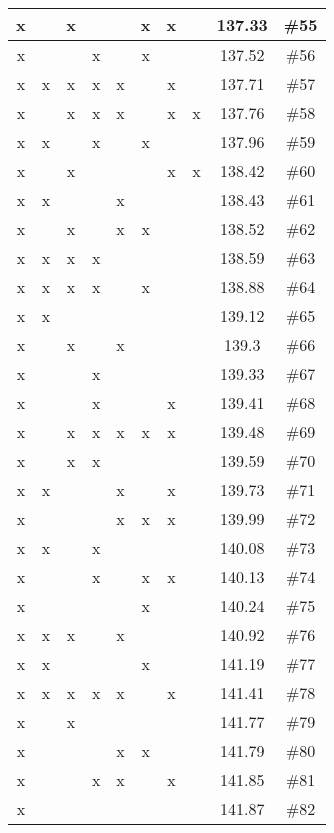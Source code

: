 \begin{center}
\begin{longtable}{|c|c|c|c|c|c|c|c|c|c|}
 x &  &  x &  &  &  x &  x &  & 137.33 & \#55 \\ \hline
 x &  &  &  x &  &  x &  &  & 137.52 & \#56 \\ \hline
 x &  x &  x &  x &  x &  &  x &  & 137.71 & \#57 \\ \hline
 x &  &  x &  x &  x &  &  x &  x & 137.76 & \#58 \\ \hline
 x &  x &  &  x &  &  x &  &  & 137.96 & \#59 \\ \hline
 x &  &  x &  &  &  &  x &  x & 138.42 & \#60 \\ \hline
 x &  x &  &  &  x &  &  &  & 138.43 & \#61 \\ \hline
 x &  &  x &  &  x &  x &  &  & 138.52 & \#62 \\ \hline
 x &  x &  x &  x &  &  &  &  & 138.59 & \#63 \\ \hline
 x &  x &  x &  x &  &  x &  &  & 138.88 & \#64 \\ \hline
 x &  x &  &  &  &  &  &  & 139.12 & \#65 \\ \hline
 x &  &  x &  &  x &  &  &  & 139.3 & \#66 \\ \hline
 x &  &  &  x &  &  &  &  & 139.33 & \#67 \\ \hline
 x &  &  &  x &  &  &  x &  & 139.41 & \#68 \\ \hline
 x &  &  x &  x &  x &  x &  x &  & 139.48 & \#69 \\ \hline
 x &  &  x &  x &  &  &  &  & 139.59 & \#70 \\ \hline
 x &  x &  &  &  x &  &  x &  & 139.73 & \#71 \\ \hline
 x &  &  &  &  x &  x &  x &  & 139.99 & \#72 \\ \hline
 x &  x &  &  x &  &  &  &  & 140.08 & \#73 \\ \hline
 x &  &  &  x &  &  x &  x &  & 140.13 & \#74 \\ \hline
 x &  &  &  &  &  x &  &  & 140.24 & \#75 \\ \hline
 x &  x &  x &  &  x &  &  &  & 140.92 & \#76 \\ \hline
 x &  x &  &  &  &  x &  &  & 141.19 & \#77 \\ \hline
 x &  x &  x &  x &  x &  &  x &  & 141.41 & \#78 \\ \hline
 x &  &  x &  &  &  &  &  & 141.77 & \#79 \\ \hline
 x &  &  &  &  x &  x &  &  & 141.79 & \#80 \\ \hline
 x &  &  &  x &  x &  &  x &  & 141.85 & \#81 \\ \hline
 x &  &  &  &  &  &  &  & 141.87 & \#82 \\ \hline

\end{longtable}
\end{center}
